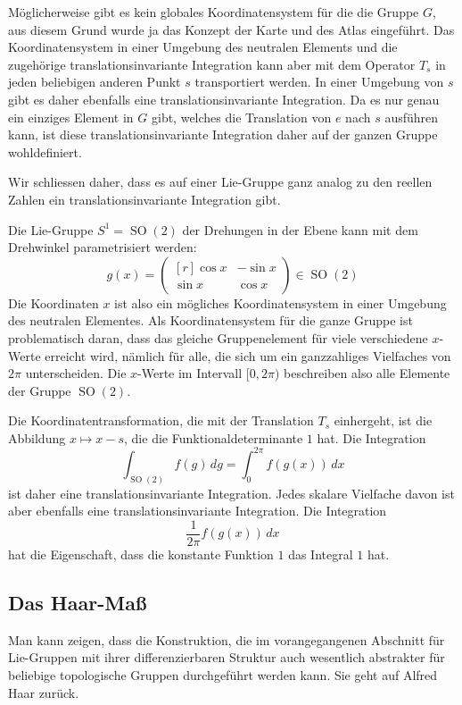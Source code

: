 Möglicherweise gibt es kein globales Koordinatensystem für die 
die Gruppe $G$, aus diesem Grund wurde ja das Konzept der Karte
und des Atlas eingeführt.
Das Koordinatensystem in einer Umgebung des neutralen Elements und
die zugehörige translationsinvariante Integration kann aber mit
dem Operator $T_s$ in jeden beliebigen anderen Punkt $s$ transportiert
werden.
In einer Umgebung von $s$ gibt es daher ebenfalls eine
translationsinvariante Integration.
Da es nur genau ein einziges Element in $G$ gibt, welches die Translation
von $e$ nach $s$ ausführen kann, ist diese translationsinvariante 
Integration daher auf der ganzen Gruppe wohldefiniert.

Wir schliessen daher, dass es auf einer Lie-Gruppe ganz analog 
zu den reellen Zahlen ein translationsinvariante Integration
gibt.

\begin{beispiel}
Die Lie-Gruppe $S^1 = \operatorname{SO}(2)$ der Drehungen in der Ebene
kann mit dem Drehwinkel parametrisiert werden:
\[
g(x)
=
\begin{pmatrix*}[r]
\cos x&-\sin x\\
\sin x& \cos x
\end{pmatrix*}
\in
\operatorname{SO}(2)
\]
Die Koordinaten $x$ ist also ein mögliches Koordinatensystem in einer
Umgebung des neutralen Elementes.
Als Koordinatensystem für die ganze Gruppe ist problematisch daran,
dass das gleiche Gruppenelement für viele verschiedene $x$-Werte
erreicht wird, nämlich für alle, die sich um ein ganzzahliges
Vielfaches von $2\pi$ unterscheiden.
Die $x$-Werte im Intervall $[0,2\pi)$ beschreiben also alle Elemente
der Gruppe $\operatorname{SO}(2)$. 

Die Koordinatentransformation, die mit der Translation $T_s$ einhergeht,
ist die Abbildung $x\mapsto x-s$, die die Funktionaldeterminante $1$
hat.
Die Integration
\[
\int_{\operatorname{SO}(2)} f(g) \,dg
=
\int_0^{2\pi} f(g(x))\,dx
\]
ist daher eine translationsinvariante Integration.
Jedes skalare Vielfache davon ist aber ebenfalls eine translationsinvariante
Integration.
Die Integration
\[
\frac{1}{2\pi} f(g(x))\,dx
\]
hat die Eigenschaft, dass die konstante Funktion $1$ das Integral $1$
hat.
\end{beispiel}

%
%
\subsection{Das Haar-Maß
\label{buch:haar:subsection:haar}}
Man kann zeigen, dass die Konstruktion, die im vorangegangenen Abschnitt
für Lie-Gruppen mit ihrer differenzierbaren Struktur auch wesentlich
abstrakter für beliebige topologische Gruppen durchgeführt werden kann.
Sie geht auf Alfred Haar zurück.

